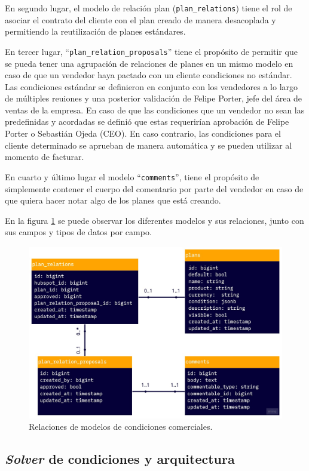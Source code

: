    En segundo lugar, el modelo de relación plan (\texttt{plan\_relations}) tiene el rol de asociar el contrato del cliente con el plan creado de manera desacoplada y permitiendo la reutilización de planes estándares. 
    
    En tercer lugar, ``\texttt{plan\_relation\_proposals}'' tiene el propósito de permitir que se pueda tener una agrupación de relaciones de planes en un mismo modelo en caso de que un vendedor haya pactado con un cliente condiciones no estándar. Las condiciones estándar se definieron en conjunto con los vendedores a lo largo de múltiples reuiones y una posterior validación de Felipe Porter, jefe del área de ventas de la empresa. En caso de que las condiciones que un vendedor no sean las predefinidas y acordadas se definió que estas requerirían aprobación de Felipe Porter o Sebastián Ojeda (CEO). En caso contrario, las condiciones para el cliente determinado se aprueban de manera automática y se pueden utilizar al momento de facturar.
    
    En cuarto y último lugar el modelo ``\texttt{comments}'', tiene el propósito de simplemente contener el cuerpo del comentario por parte del vendedor en caso de que quiera hacer notar algo de los planes que está creando.

    En la figura \ref{fig:cc_relations} se puede observar los diferentes modelos y sus relaciones, junto con sus campos y tipos de datos por campo.
    
    \begin{figure}
      \centering
      \includegraphics[width=0.75\linewidth]{figures/cc/cc_relations.jpg}
      \caption{Relaciones de modelos de condiciones comerciales.}
      \label{fig:cc_relations}
    \end{figure}

  \subsection{\textit{Solver} de condiciones y arquitectura}
    \label{solver_y_arquitectura}

